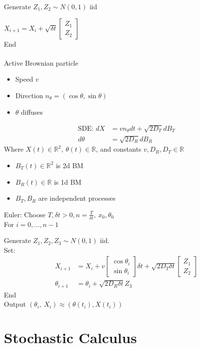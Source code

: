 \documentclass[12pt, letterpaper]{article}
\begin{document}
Generate $Z_1, Z_2 \sim N(0,1)$ iid 

$X_{i+1} = X_i + \sqrt{\delta t} \begin{bmatrix}
    Z_1 \\ Z_2 
\end{bmatrix}$\\
End \\\\
 Active Brownian particle
\begin{itemize}
    \item Speed $v$ 
    \item Direction $n_\theta = (\cos \theta, \sin \theta)$
    \item $\theta$ diffuses
\end{itemize}
\begin{align*}
    \text{SDE: } dX &= vn_\theta dt + \sqrt{2D_T}dB_T \\
    d\theta &= \sqrt{2D_R} dB_R 
\end{align*}
Where $X(t) \in \mathbb{R}^2,\ \theta(t) \in \mathbb{R}$, and constants $v, D_R, D_T \in \mathbb{R}$

\begin{itemize}
    \item $B_T(t) \in \mathbb{R}^2$ is 2d BM 
    \item $B_R(t) \in \mathbb{R}$ is 1d BM 
    \item $B_T, B_R$ are independent processes
\end{itemize}
Euler: Choose $T, \delta t > 0, n = \frac{T}{\delta t},\ x_0, \theta_0$ \\
For $i = 0,\dots, n-1$

Generate $Z_1, Z_2, Z_3 \sim N(0,1)$ iid. \\
Set:
\begin{align*}
    X_{i+1} &= X_i + v\begin{bmatrix}
        \cos \theta_i \\ \sin \theta_i
    \end{bmatrix} \delta t + \sqrt{2D_T \delta t} \begin{bmatrix}
        Z_1 \\ Z_2 
    \end{bmatrix}  \\
    \theta_{i+1} &= \theta_i + \sqrt{2D_R \delta t} Z_3
\end{align*}
End \\
Output $(\theta_i,\ X_i) \approx (\theta(t_i), X(t_i))$

\section{Stochastic Calculus}
\end{document}
